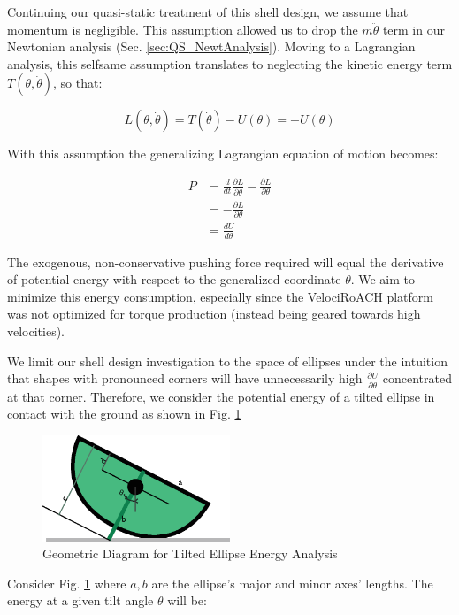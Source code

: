 \documentclass[letterpaper]{report}
\begin{document}
Continuing our quasi-static treatment of this shell design, we assume that momentum is negligible.
This assumption allowed us to drop the $m \ddot{\theta}$ term in our Newtonian analysis (Sec. \ref{sec:QS_NewtAnalysis}).
Moving to a Lagrangian analysis, this selfsame assumption translates to neglecting the kinetic energy term $T(\theta,\dot{\theta})$, so that:

$$
L(\theta,\dot{\theta}) = T(\dot{\theta}) - U(\theta) = - U(\theta)
$$

With this assumption the generalizing Lagrangian equation of motion becomes:

\begin{align}
P &= \frac{d}{dt} \frac{\partial L}{\partial \dot{\theta}} - \frac{\partial L}{\partial \theta} \\
  &= - \frac{\partial L}{\partial \theta} \\
  &= \frac{d U}{d \theta} \label{eq:QS_LagrJust}
\end{align}

The exogenous, non-conservative pushing force required will equal the derivative of potential energy with respect to the generalized coordinate $\theta$.
We aim to minimize this energy consumption, especially since the VelociRoACH platform was not optimized for torque production (instead being geared towards high velocities).

We limit our shell design investigation to the space of ellipses under the intuition that shapes with pronounced corners will have unnecessarily high $\frac{\partial U}{\partial \theta}$ concentrated at that corner.
Therefore, we consider the potential energy of a tilted ellipse in contact with the ground as shown in Fig. \ref{f:QS_energyGeometry}

\begin{figure}[ht]
\centering
\includegraphics[width=0.5\textwidth]{QS_EnergyAnalysis.eps}
\caption{\label{f:QS_energyGeometry}Geometric Diagram for Tilted Ellipse Energy Analysis}
\end{figure}

Consider Fig. \ref{f:QS_energyGeometry} where $a,b$ are the ellipse's major and minor axes' lengths.
The energy at a given tilt angle $\theta$ will be:
\end{document}
